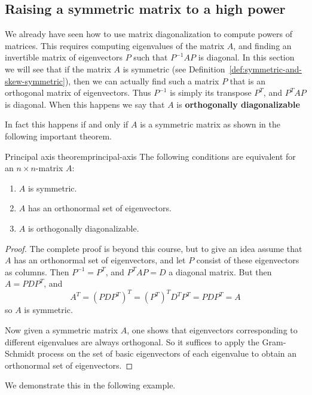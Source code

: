 \subsection{Raising a symmetric matrix to a high power}

We already have seen how to use matrix diagonalization to compute
powers of matrices. This requires computing eigenvalues of the matrix
$A$, and finding an invertible matrix of eigenvectors $P$ such that
$P^{-1}AP$ is diagonal. In this section we will see that if the matrix
$A$ is symmetric (see Definition~\ref{def:symmetric-and-skew-symmetric}),
then we can actually find such a matrix $P$ that is an orthogonal
matrix of eigenvectors. Thus $P^{-1}$ is simply its transpose
$P^T$, and $P^TAP$ is diagonal. When this happens we say that $A$ is
\textbf{orthogonally diagonalizable}

In fact this happens if and only if $A$ is a symmetric matrix as
shown in the following important theorem.

\begin{theorem}{Principal axis theorem}{principal-axis}
The following conditions are equivalent for an $n \times n$-matrix $A$:
\begin{enumerate}
\item $A$ is symmetric. 
\item $A$ has an orthonormal set of eigenvectors. 
\item $A$ is  orthogonally diagonalizable.
\end{enumerate}
\end{theorem}

\begin{proof}
The complete proof is beyond this course, but to give an idea assume
that $A$ has an orthonormal set of eigenvectors, and let $P$ consist
of these eigenvectors as columns. Then $P^{-1}=P^T$, and $P^TAP=D$ a diagonal matrix. But then $A=PDP^T$, and
\[ A^T=(PDP^T)^T = (P^T)^TD^TP^T=PDP^T=A\]
so $A$ is symmetric. 

Now given a symmetric matrix $A$, one shows that eigenvectors
corresponding to different eigenvalues are always orthogonal. So it
suffices to apply the Gram-Schmidt process on the set of basic
eigenvectors of each eigenvalue to obtain an orthonormal set of eigenvectors. 
\end{proof}

We demonstrate this in the following example. 

